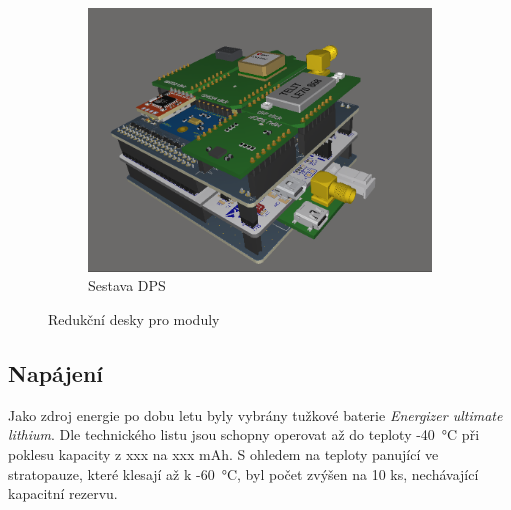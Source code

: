\documentclass[twoside]{ctuthesis}
\theoremstyle{plain}
\theoremstyle{definition}
\theoremstyle{note}
\begin{document}
\begin{figure}[hbtp]
\begin{subfigure}{.3\textwidth}
				\includegraphics[height=0.7\linewidth]{Figures/shield_assembly.png}
				\caption{Sestava DPS}
				\label{fig:shield:assembly}
			\end{subfigure}
			\caption{Redukční desky pro moduly}
			\label{fig:shields:DPS}
		\end{figure}



		
		\subsection{Napájení}
		Jako zdroj energie po dobu letu byly vybrány tužkové baterie \textit{Energizer ultimate lithium}. Dle technického listu \cite{dsh:AA} jsou schopny operovat až do teploty -40~°C při poklesu kapacity z xxx na xxx mAh. S ohledem na teploty panující ve stratopauze, které klesají až k -60~°C, byl počet zvýšen na 10 ks, nechávající kapacitní rezervu. 
\end{document}
